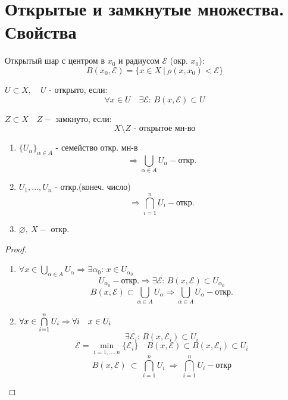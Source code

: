 \documentclass[geometry.tex]{subfiles}
\begin{document}
  \section{Открытые и замкнутые множества. Свойства}

  \begin{definition}
      Открытый шар с центром в $x_0$ и радиусом $\mathcal{E}$ (окр.  $x_0$):
      \[B(x_0, \mathcal{E}) = \{x \in X \ | \ \rho(x, x_0) < \mathcal{E}\}\]
  \end{definition}

  \begin{definition}
      $U \subset X, \quad U$ - открыто, если:
      \[\forall x \in U \quad \exists \mathcal{E}\text{: } B(x, \mathcal{E}) \subset U\]
  \end{definition}

  \begin{definition}
      $Z \subset X \quad Z -$ замкнуто, если:
      \[X \setminus Z \text{ - открытое мн-во}\]
  \end{definition}

  \begin{theorem}[св-ва откр. мн-в]
      \begin{enumerate}
          \item $\{ U_\alpha \}_{\alpha \in A}$ - семейство откр. мн-в
                 \[\Rightarrow \bigcup_{\alpha \in A}U_\alpha - \text{откр.}\]
          \item $U_1,...,U_n$ - откр.(конеч. число) \[\Rightarrow \bigcap_{i = 1}^n U_i - \text{откр.}\]
          \item $\varnothing,\ X - $ откр.
      \end{enumerate}
  \end{theorem}
  \begin{proof}
      \begin{enumerate}
          \item $\forall x \in \bigcup\limits_{\alpha \in A} U_\alpha \Rightarrow \exists \alpha_0\text{: } x \in U_{\alpha_0}$
                 \[U_{\alpha_0} - \text{откр.}\Rightarrow \exists \mathcal{E}\text{: } B(x, \mathcal{E}) \subset U_{\alpha_0}\]
                 \[B(x, \mathcal{E}) \subset \bigcup_{\alpha \in A} U_\alpha \Rightarrow
                 \bigcup_{\alpha \in A} U_\alpha - \text{откр.}\]
          \item $\forall x \in \bigcap\limits_{i = 1}^n U_i \Rightarrow \forall i \quad x \in U_i$
                \[\exists \mathcal{E}_i\text{: } B(x, \mathcal{E}_i) \subset U_i\]
                \[\mathcal{E} = \min_{i = 1,..., n}\{\mathcal{E}_i\} \quad B(x, \mathcal{E}) \subset B(x, \mathcal{E}_i) \subset U_i\]
                \[B(x, \mathcal{E}) \ \subset\  \bigcap\limits_{i=1}^n U_i\  \Rightarrow\  \bigcap\limits_{i = 1} ^ n U_i - \text{откр}\]
      \end{enumerate}
  \end{proof}
\end{document}
